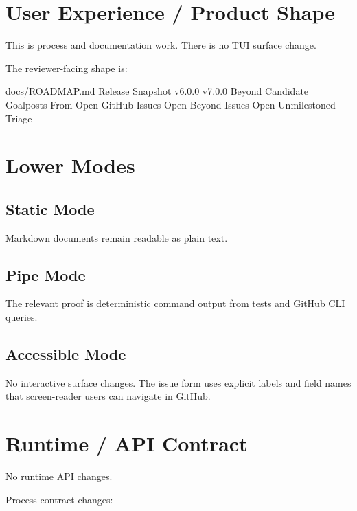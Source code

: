 \section{User Experience / Product Shape}\label{record-212-user-experience-product-shape}

This is process and documentation work. There is no TUI surface change.

The reviewer-facing shape is:

\begin{CodeBlock}
docs/ROADMAP.md
  Release Snapshot
  v6.0.0
  v7.0.0
  Beyond
    Candidate Goalposts From Open GitHub Issues
    Open Beyond Issues
    Open Unmilestoned Triage
\end{CodeBlock}

\section{Lower Modes}\label{record-212-lower-modes}

\subsection{Static Mode}\label{record-212-static-mode}

Markdown documents remain readable as plain text.

\subsection{Pipe Mode}\label{record-212-pipe-mode}

The relevant proof is deterministic command output from tests and GitHub CLI queries.

\subsection{Accessible Mode}\label{record-212-accessible-mode}

No interactive surface changes. The issue form uses explicit labels and field names that screen-reader users can navigate in GitHub.

\section{Runtime / API Contract}\label{record-212-runtime-api-contract}

No runtime API changes.

Process contract changes:

